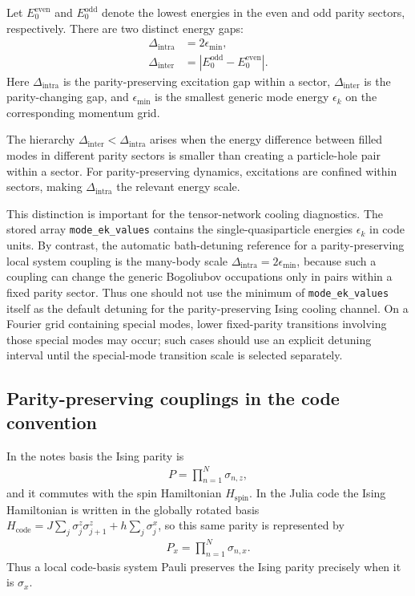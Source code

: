 \documentclass[aps,prx,twocolumn,superscriptaddress,nofootinbib,nolongbibliography,nobalancelastpage,10pt,floatfix]{revtex4-2}
\begin{document}
Let $E_0^{\mathrm{even}}$ and $E_0^{\mathrm{odd}}$ denote the lowest energies in the even and odd parity sectors, respectively.
There are two distinct energy gaps:
\begin{align}
    \Delta_{\mathrm{intra}} &= 2\epsilon_{\min},\\
    \Delta_{\mathrm{inter}} &= |E_0^{\mathrm{odd}} - E_0^{\mathrm{even}}|.
\end{align}
Here $\Delta_{\mathrm{intra}}$ is the parity-preserving excitation gap within a sector, $\Delta_{\mathrm{inter}}$ is the parity-changing gap, and $\epsilon_{\min}$ is the smallest generic mode energy $\epsilon_k$ on the corresponding momentum grid.

The hierarchy $\Delta_{\mathrm{inter}} < \Delta_{\mathrm{intra}}$ arises when the energy difference between filled modes in different parity sectors is smaller than creating a particle-hole pair within a sector. For parity-preserving dynamics, excitations are confined within sectors, making $\Delta_{\mathrm{intra}}$ the relevant energy scale.

This distinction is important for the tensor-network cooling diagnostics.  The
stored array \texttt{mode\_ek\_values} contains the single-quasiparticle
energies $\epsilon_k$ in code units.  By contrast, the automatic bath-detuning
reference for a parity-preserving local system coupling is the many-body scale
$\Delta_{\mathrm{intra}}=2\epsilon_{\min}$, because such a coupling can change
the generic Bogoliubov occupations only in pairs within a fixed parity sector.
Thus one should not use the minimum of \texttt{mode\_ek\_values} itself as the
default detuning for the parity-preserving Ising cooling channel.  On a
Fourier grid containing special modes, lower fixed-parity transitions involving
those special modes may occur; such cases should use an explicit detuning
interval until the special-mode transition scale is selected separately.



\subsection{Parity-preserving couplings in the code convention}
In the notes basis the Ising parity is
\begin{align}
    P=\prod_{n=1}^N \sigma_{n,z},
\end{align}
and it commutes with the spin Hamiltonian \(H_{\mathrm{spin}}\).  In the Julia code the
Ising Hamiltonian is written in the globally rotated basis
\(H_{\mathrm{code}}=J\sum_j\sigma^z_j\sigma^z_{j+1}
+h\sum_j\sigma^x_j\), so this same parity is represented by
\begin{align}
    P_x=\prod_{n=1}^N \sigma_{n,x}.
\end{align}
Thus a local code-basis system Pauli preserves the Ising parity precisely when
it is \(\sigma_x\).
\end{document}
